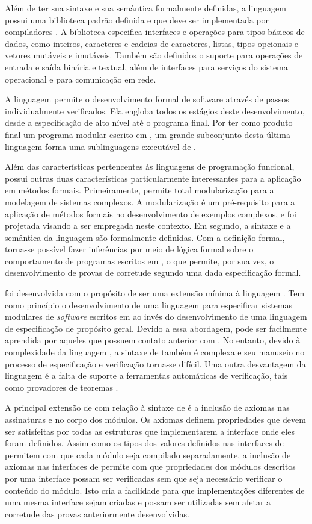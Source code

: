 Além de ter sua sintaxe e sua semântica formalmente definidas, a linguagem \SML possui uma biblioteca padrão definida e que deve ser implementada por compiladores \cite{MLLib}.
A biblioteca especifica interfaces e operações para tipos básicos de dados, como inteiros, caracteres e cadeias de caracteres, listas, tipos opcionais e vetores mutáveis e imutáveis.
Também são definidos o suporte para operações de entrada e saída binária e textual, além de interfaces para serviços do sistema operacional e para comunicação em rede.

A linguagem \EML permite o desenvolvimento formal de software através de passos individualmente verificados.
Ela engloba todos os estágios deste desenvolvimento, desde a especificação de alto nível até o programa final.
Por ter como produto final um programa modular escrito em \SML, um grande subconjunto desta última linguagem forma uma sublinguagens executável de \EML.

Além das características pertencentes às linguagens de programação funcional, \EML possui outras duas características particularmente interessantes para a aplicação em métodos formais.
Primeiramente, permite total modularização para a modelagem de sistemas complexos.
A modularização é um pré-requisito para a aplicação de métodos formais no desenvolvimento de exemplos complexos, e \EML foi projetada visando a ser empregada neste contexto.
Em segundo, a sintaxe e a semântica da linguagem são formalmente definidas.
Com a definição formal, torna-se possível fazer inferências por meio de lógica formal sobre o comportamento de programas escritos em \SML, o que permite, por sua vez, o desenvolvimento de provas de corretude segundo uma dada especificação formal.

\EML foi desenvolvida com o propósito de ser uma extensão mínima à linguagem \SML.
Tem como princípio o desenvolvimento de uma linguagem para especificar sistemas modulares de \textit{software} escritos em \SML ao invés do desenvolvimento de uma linguagem de especificação de propósito geral.
Devido a essa abordagem, \EML pode ser facilmente aprendida por aqueles que possuem contato anterior com \SML.
No entanto, devido à complexidade da linguagem \SML, a sintaxe de \EML também é complexa e seu manuseio no processo de especificação e verificação torna-se difícil.
Uma outra desvantagem da linguagem é a falta de suporte a ferramentas automáticas de verificação, tais como provadores de teoremas \cite{MLSurvay}.

A principal extensão de \EML com relação à sintaxe de \SML é a inclusão de axiomas nas assinaturas e no corpo dos módulos.
Os axiomas definem propriedades que devem ser satisfeitas por todas as estruturas que implementarem a interface onde eles foram definidos.
Assim como os tipos dos valores definidos nas interfaces de \SML permitem com que cada módulo seja compilado separadamente, a inclusão de axiomas nas interfaces de \EML permite com que propriedades dos módulos descritos por uma interface possam ser verificadas sem que seja necessário verificar o conteúdo do módulo.
Isto cria a facilidade para que implementações diferentes de uma mesma interface sejam criadas e possam ser utilizadas sem afetar a corretude das provas anteriormente desenvolvidas.

